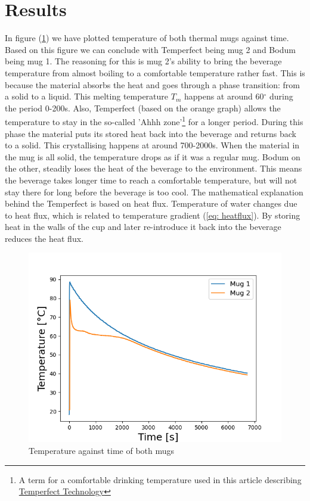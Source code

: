 \documentclass[reprint,english,notitlepage]{revtex4-2}
\begin{document}
\section{Results}
In figure (\ref{fig:temperature}) we have plotted temperature of both thermal mugs against time. Based on this figure we can conclude with Temperfect being mug 2 and Bodum being mug 1. The reasoning for this is mug 2's ability to bring the beverage temperature from almost boiling to a comfortable temperature rather fast. This is because the material absorbs the heat and goes through a phase transition: from a solid to a liquid. This melting temperature $T_m$ happens at around 60$^{\circ}$ during the period 0-200s.
Also, Temperfect (based on the orange graph) allows the temperature to stay in the so-called 'Ahhh zone'\footnote{A term for a comfortable drinking temperature used in this article describing \href{https://joeveo.com/pages/the-temperfect-mug}{Temperfect Technology}} for a longer period. During this phase the material puts its stored heat back into the beverage and returns back to a solid. This crystallising happens at around 700-2000s.
When the material in the mug is all solid, the temperature drops as if it was a regular mug.
Bodum on the other, steadily loses the heat of the beverage to the environment. This means the beverage takes longer time to reach a comfortable temperature, but will not stay there for long before the beverage is too cool.
The mathematical explanation behind the Temperfect is based on heat flux. Temperature of water changes due to heat flux, which is related to temperature gradient (\ref{eq: heatflux}). By storing heat in the walls of the cup and later re-introduce it back into the beverage reduces the heat flux.

\begin{figure}
  \includegraphics[scale=0.5]{temp.png}
  \caption{Temperature against time of both mugs}\label{fig:temperature}
\end{figure}
\FloatBarrier
\end{document}
